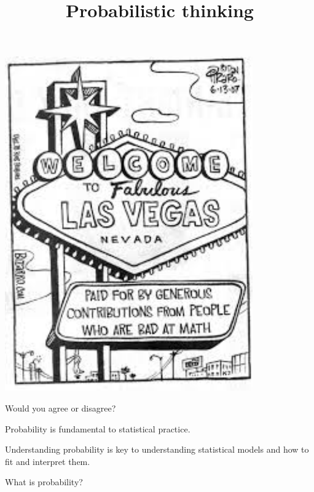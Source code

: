 

\title[Probabilistic thinking]{Probabilistic thinking}



\begin{frame}


\bigskip
\centering
\includegraphics[width=0.40\linewidth]{../LectureAssets/L01/Lecture01cartoon}

\bigskip

\end{frame}



\begin{frame}{Would you agree or disagree?}

\begin{LARGE}
Probability is fundamental to statistical practice. 
\end{LARGE}

\bigskip

Understanding probability is key to understanding statistical models and how to fit and interpret them.

\end{frame}

\begin{frame}{}
\centering

\bigskip

\bigskip

\smallskip

\begin{Huge}
What is probability?
\end{Huge}

\end{frame}

